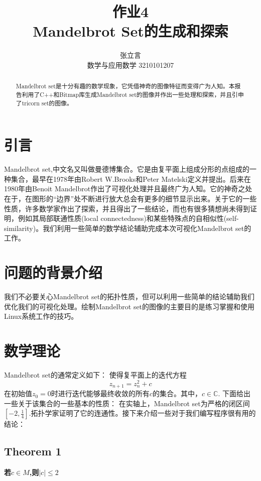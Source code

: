 \documentclass{ctexart}
\begin{document}
\title{作业4\\Mandelbrot Set的生成和探索}
\author{张立言\\数学与应用数学 3210101207}
\maketitle

\begin{abstract}
Mandelbrot set是十分有趣的数学现象，它凭借神奇的图像特征而变得广为人知。本报告利用了C++和Bitmap库生成Mandelbrot set的图像并作出一些处理和探索，并且引申了tricorn set的图像。

\end{abstract}
\section{引言}
Mandelbrot set,中文名又叫做曼德博集合。它是由复平面上组成分形的点组成的一种集合，最早在1978年由Robert W.Brooks和Peter Matelski定义并提出。后来在1980年由Benoit Mandelbrot作出了可视化处理并且最终广为人知。它的神奇之处在于，在图形的“边界”处不断进行放大总会有更多的细节显示出来。关于它的一些性质，许多数学家作出了探索，并且得出了一些结论，而也有很多猜想尚未得到证明，例如其局部联通性质(local connectedness)和某些特殊点的自相似性(self-similarity)。我们利用一些简单的数学结论辅助完成本次可视化Mandelbrot set的工作。

\section{问题的背景介绍}
我们不必要关心Mandelbrot set的拓扑性质，但可以利用一些简单的结论辅助我们优化我们的可视化处理。绘制Mandelbrot set的图像的主要目的是练习掌握和使用Linux系统工作的技巧。
\section{数学理论}
Mandelbrot set的通常定义如下：
使得复平面上的迭代方程
\begin{equation}
z_{n+1}=z_n^2+c \label{iteq}
\end{equation}
在初始值$z_0=0$时进行迭代能够最终收敛的所有$c$的集合。其中，$c \in \mathbb{C}$.
下面给出一些关于该集合的一些基本的性质：
在实轴上，Mandelbrot set为严格的闭区间$[-2,\frac{1}{4}]$.拓扑学家证明了它的连通性。接下来介绍一些对于我们编写程序很有用的结论：
\subsection{Theorem 1}
\textbf{若$c\in M$,则$|c|\le 2$}
\end{document}
